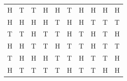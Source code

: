           \begin{table}
        \begin{center}
      \label{m39373*uid56}
    \noindent
      \tablelasttail{}
      \begin{xtabular}[t]{|l|l|l|l|l|l|l|l|l|l|}\hline
        H &
        T &
        T &
        H &
        H &
        T &
        H &
        H &
        H &
        H%
     \tabularnewline{}
        H &
        H &
        H &
        H &
        T &
        H &
        H &
        T &
        T &
        T%
     \tabularnewline{}
        T &
        T &
        H &
        T &
        T &
        H &
        T &
        H &
        T &
        H%
     \tabularnewline{}
        H &
        H &
        T &
        T &
        H &
        T &
        T &
        H &
        T &
        T%
     \tabularnewline{}
        T &
        H &
        H &
        H &
        T &
        T &
        H &
        T &
        T &
        H%
     \tabularnewline{}
        H &
        T &
        T &
        T &
        T &
        H &
        T &
        T &
        H &
        H%
     \tabularnewline{}

\end{xtabular}
\end{center}
\end{table}
